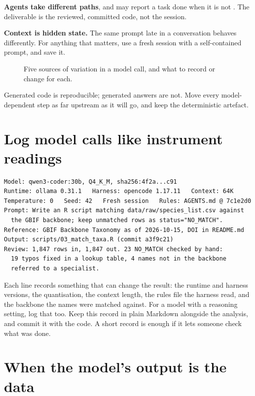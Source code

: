 \textbf{Agents take different paths}, and may report a task done when it is not
\parencite{shapira2026agentsofchaos}. The deliverable is the reviewed, committed
code, not the session.

\textbf{Context is hidden state.} The same prompt late in a conversation behaves
differently. For anything that matters, use a fresh session with a
self-contained prompt, and save it.

\begin{figure}[htbp]
\centering
{}
\caption{Five sources of variation in a model call, and what to record or
change for each.}
\label{fig:variation}
\end{figure}

\begin{keypoint}
Generated code is reproducible; generated answers are not. Move every
model-dependent step as far upstream as it will go, and keep the deterministic
artefact.
\end{keypoint}

\section{Log model calls like instrument readings}

\begin{lstlisting}[caption={logs/2026-10-15\_taxon-matching.md}]
Model: qwen3-coder:30b, Q4_K_M, sha256:4f2a...c91
Runtime: ollama 0.31.1   Harness: opencode 1.17.11   Context: 64K
Temperature: 0   Seed: 42   Fresh session   Rules: AGENTS.md @ 7c1e2d0
Prompt: Write an R script matching data/raw/species_list.csv against
  the GBIF backbone; keep unmatched rows as status="NO_MATCH".
Reference: GBIF Backbone Taxonomy as of 2026-10-15, DOI in README.md
Output: scripts/03_match_taxa.R (commit a3f9c21)
Review: 1,847 rows in, 1,847 out. 23 NO_MATCH checked by hand:
  19 typos fixed in a lookup table, 4 names not in the backbone
  referred to a specialist.
\end{lstlisting}

Each line records something that can change the result: the runtime and
harness versions, the quantisation, the context length, the rules file the
harness read, and the backbone the names were matched against. For a model
with a reasoning setting, log that too. Keep this record in plain Markdown
alongside the analysis, and commit it with the code. A short record is enough
if it lets someone check what was done.

\section{When the model's output is the data}
\label{sec:outputasdata}

